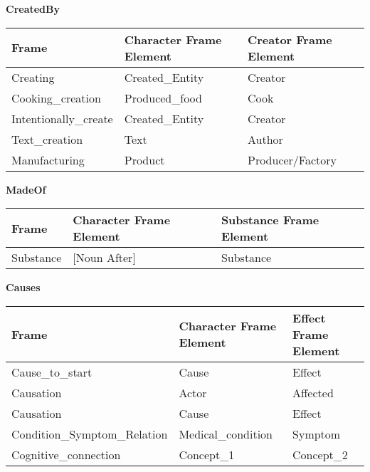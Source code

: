 \textbf{CreatedBy}
\begin{table}[!htbp]
    \begin{tabular}{|l|l|l|}
    \hline
    \textbf{Frame}                & \textbf{Character Frame Element} & \textbf{Creator Frame Element} \\ \hline
    Creating             & Created\_Entity         & Creator               \\ \hline
    Cooking\_creation    & Produced\_food          & Cook                  \\ \hline
    Intentionally\_create & Created\_Entity         & Creator               \\ \hline
    Text\_creation       & Text                    & Author                \\ \hline
    Manufacturing        & Product                 & Producer/Factory      \\ \hline
    \end{tabular}
\end{table}

\textbf{MadeOf}
\begin{table}[!htbp]
    \begin{tabular}{|l|l|l|}
    \hline
    \textbf{Frame}     & \textbf{Character Frame Element} & \textbf{Substance Frame Element} \\ \hline
    Substance & [Noun After]            & Substance               \\ \hline
    \end{tabular}
\end{table}

\textbf{Causes} 
\begin{table}[!htbp]
    \begin{tabular}{|l|l|l|}
    \hline
    \textbf{Frame}                      & \textbf{Character Frame Element} & \textbf{Effect Frame Element} \\ \hline
    Cause\_to\_start           & Cause                   & Effect               \\ \hline
    Causation                  & Actor                   & Affected             \\ \hline
    Causation                  & Cause                   & Effect               \\ \hline
    Condition\_Symptom\_Relation & Medical\_condition      & Symptom              \\ \hline
    Cognitive\_connection      & Concept\_1              & Concept\_2           \\ \hline
    \end{tabular}
\end{table}

